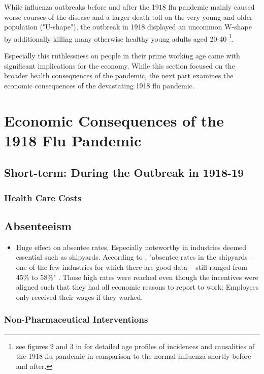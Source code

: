\documentclass[12pt,a4paper]{article}
\begin{document}
While influenza outbreaks before and after the 1918 flu pandemic mainly caused worse courses of the disease and a larger death toll on the very young and older population ("U-shape"),
the outbreak in 1918 displayed an uncommon W-shape by additionally killing many otherwise healthy young adults aged 20-40 \citep{taubenberger1918InfluenzaMother2006}\footnote{
	see figures 2 and 3 in \cite{taubenberger1918InfluenzaMother2006} for detailed age profiles of incidences and causalities of the 1918 flu pandemic in comparison to the normal influenza shortly before and after.}.

Especially this ruthlessness on people in their prime working age came with significant implications for the economy.
While this section focused on the broader health consequences of the pandemic, the next part examines the economic consequences of the devastating 1918 flu pandemic.

\section{Economic Consequences of the 1918 Flu Pandemic}
\subsection{Short-term: During the Outbreak in 1918-19}
\subsubsection{Health Care Costs}
\subsection{Absenteeism}

\begin{itemize}
	\item Huge effect on absentee rates. Especially noteworthy in industries deemed essential such as shipyards. According to \cite{barryPandemicsAvoidingMistakes2009}, "absentee rates in the shipyards -- one of the few industries for which there are good data -- still ranged from 45\% to 58\%" \citep{turnerReportPreventiveMeasure}.
	Those high rates were reached even though the incentives were aligned such that they had all economic reasons to report to work: Employees only received their wages if they worked.
\end{itemize}

\subsubsection{Non-Pharmaceutical Interventions}
\end{document}
